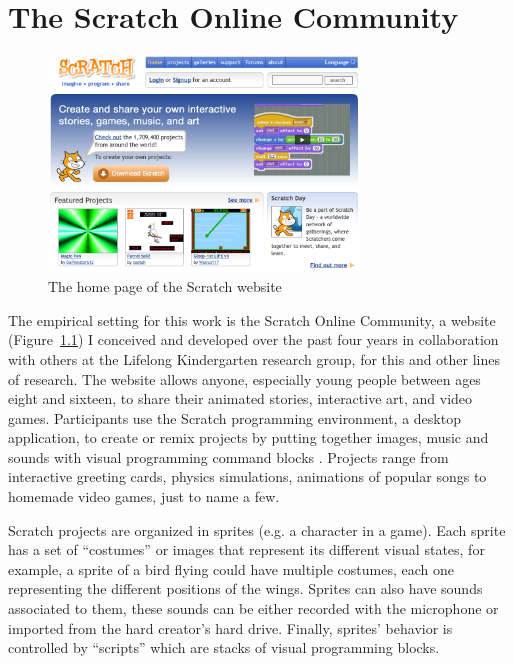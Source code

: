 \chapter{The Scratch Online Community}

\begin{figure}
\centering
\includegraphics[width=3.25in]{figures/websitehomepage.png}
\caption{The home page of the Scratch website}
\label{fig:websitehomepage}
\end{figure}

The empirical setting for this work is the Scratch Online Community, a website (Figure~\ref{fig:websitehomepage}) I conceived and developed over the past four years in collaboration with others at the Lifelong Kindergarten research group, for this and other lines of research.
The website allows anyone, especially young people between ages eight and sixteen, to share their animated stories, interactive art, and video games. Participants use the Scratch programming environment, a desktop application, to create or remix projects by putting together images, music and sounds with visual programming command blocks \citep{resnick_scratch:_2009}.
Projects range from interactive greeting cards, physics simulations, animations of popular songs to homemade video games, just to name a few.  

Scratch projects are organized in sprites (e.g. a character in a game).
Each sprite has a set of ``costumes'' or images that represent its different visual states, for example, a sprite of a bird flying could have multiple costumes, each one representing the different positions of the wings. 
Sprites can also have sounds associated to them, these sounds can be either recorded with the microphone or imported from the hard creator's hard drive. Finally, sprites' behavior is controlled by ``scripts'' which are stacks of visual programming blocks. 

